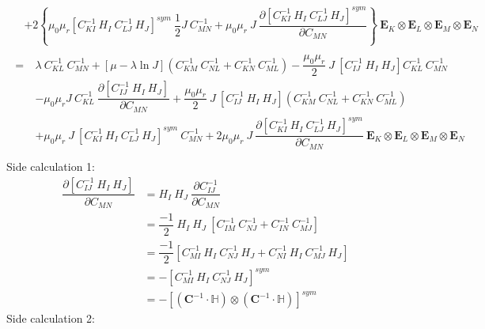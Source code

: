 \documentclass[11pt,a4paper,final]{article}
\begin{document}
\begin{align*}
\begin{split}
&+ 2 \left\lbrace \mu_0 \mu_r [C^{-1}_{KI} \ H_I \ C^{-1}_{LJ} \ H_J]^{sym} \ \dfrac{1}{2} J \ C^{-1}_{MN} + \mu_0 \mu_r \ J \ \dfrac{\partial [C^{-1}_{KI} \ H_I \ C^{-1}_{LJ} \ H_J]^{sym}}{\partial C_{MN}} \right\rbrace \ \mathbf{E}_K \otimes \mathbf{E}_L \otimes \mathbf{E}_M \otimes \mathbf{E}_N
\end{split}\\
\begin{split}
=\ & \lambda \ C^{-1}_{KL} \ C^{-1}_{MN} + [\mu - \lambda \ln J] \left( C^{-1}_{KM} \ C^{-1}_{NL} + C^{-1}_{KN} \ C^{-1}_{ML} \right) - \dfrac{\mu_0 \mu_r}{2} \ J \ [C^{-1}_{IJ} \ H_I \ H_J] C^{-1}_{KL} \ C^{-1}_{MN}  \\
&- \mu_0 \mu_r J \ C^{-1}_{KL} \ \dfrac{\partial [C^{-1}_{IJ} \ H_I \ H_J]}{\partial C_{MN}} + \dfrac{\mu_0 \mu_r}{2} \ J \ [C^{-1}_{IJ} \ H_I \ H_J] (C^{-1}_{KM} \ C^{-1}_{NL} + C^{-1}_{KN} \ C^{-1}_{ML}) \\
&+ \mu_0 \mu_r \ J \ [C^{-1}_{KI} \ H_I \ C^{-1}_{LJ} \ H_J]^{sym} \ C^{-1}_{MN} + 2 \mu_0 \mu_r \ J \ \dfrac{\partial [C^{-1}_{KI} \ H_I \ C^{-1}_{LJ} \ H_J]^{sym}}{\partial C_{MN}} \ \mathbf{E}_K \otimes \mathbf{E}_L \otimes \mathbf{E}_M \otimes \mathbf{E}_N
\end{split}\\
\end{align*}
\newline
Side calculation 1:
\begin{align*}
\dfrac{\partial [C^{-1}_{IJ} \ H_I \ H_J]}{\partial C_{MN}} &= H_I \ H_J \ \dfrac{\partial C^{-1}_{IJ}}{\partial C_{MN}}\\
&= \dfrac{-1}{2} \ H_I \ H_J \ [C^{-1}_{IM} \ C^{-1}_{NJ} + C^{-1}_{IN} \ C^{-1}_{MJ}]\\
&= \dfrac{-1}{2} [C^{-1}_{MI} \ H_I \ C^{-1}_{NJ} \ H_J + C^{-1}_{NI} \ H_I \ C^{-1}_{MJ} \ H_J]\\
&= - [C^{-1}_{MI} \ H_I \ C^{-1}_{NJ} \ H_J]^{sym}\\
&= - [ (\mathbf{C}^{-1} \cdot \mathbb{H}) \otimes (\mathbf{C}^{-1} \cdot \mathbb{H}) ]^{sym}
\end{align*}
Side calculation 2:
\end{document}
